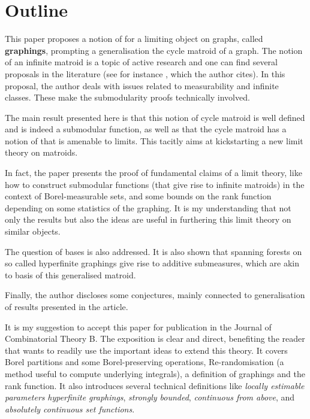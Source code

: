 \documentclass[12pt]{article}
\begin{document}
\maketitle




\section*{Outline}

This paper proposes a notion of  for a  limiting object on graphs, called \textbf{graphings}, prompting a generalisation the cycle matroid of a graph.
The notion of an infinite matroid is a topic of active research and one can find several proposals in the literature (see for instance \cite{bruhn2013axioms}, which the author cites).
In this proposal, the author deals with issues related to measurability and infinite classes.
These make the submodularity proofs technically involved.

The main result presented here is that this notion of cycle matroid is well defined and is indeed a submodular function, as well as that the cycle matroid has a notion of  that is amenable to limits.
This tacitly aims at kickstarting a new limit theory on matroids.

In fact, the paper presents the proof of fundamental claims of a limit theory, like how to construct submodular functions (that give rise to infinite matroids) in the context of Borel-measurable sets, and some bounds on the rank function depending on some statistics of the graphing.
It is my understanding that not only the results but also the ideas are useful in furthering this limit theory on similar objects.

The question of bases is also addressed.
It is also shown that spanning forests on so called hyperfinite graphings give rise to additive submeasures, which are akin to basis of this generalised matroid.

Finally, the author discloses some conjectures, mainly connected to generalisation of results presented in the article.

It is my suggestion to accept this paper for publication in the Journal of Combinatorial Theory B.
The exposition is clear and direct, benefiting the reader that wants to readily use the important ideas to extend this theory.
It covers Borel partitions and some Borel-preserving operations, Re-randomisation (a method useful to compute underlying integrals), a definition of graphings and the rank function.
It also introduces several technical definitions like \textit{locally estimable parameters} \textit{hyperfinite graphings}, \textit{strongly bounded}, \textit{continuous from above}, and \textit{absolutely continuous set functions}.
\end{document}
